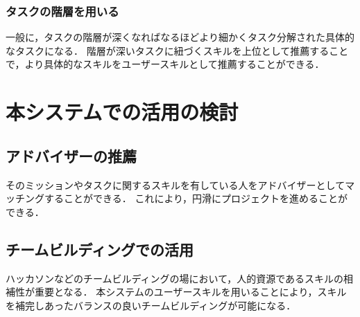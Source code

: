 \subsubsection{タスクの階層を用いる}
一般に，タスクの階層が深くなればなるほどより細かくタスク分解された具体的なタスクになる．
階層が深いタスクに紐づくスキルを上位として推薦することで，より具体的なスキルをユーザースキルとして推薦することができる．

\section{本システムでの活用の検討}

\subsection{アドバイザーの推薦}
そのミッションやタスクに関するスキルを有している人をアドバイザーとしてマッチングすることができる．
これにより，円滑にプロジェクトを進めることができる．

\subsection{チームビルディングでの活用}
ハッカソンなどのチームビルディングの場において，人的資源であるスキルの相補性が重要となる．
本システムのユーザースキルを用いることにより，スキルを補完しあったバランスの良いチームビルディングが可能になる．
